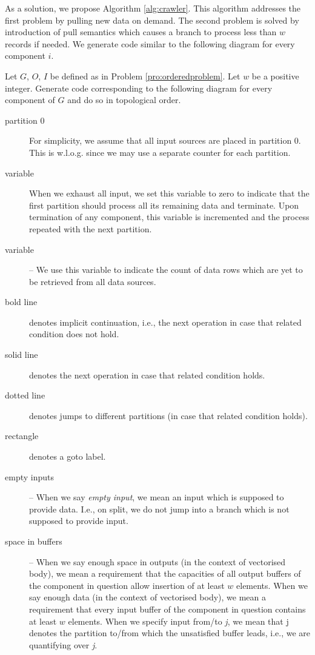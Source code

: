 As a solution, we propose Algorithm \ref{alg:crawler}. This algorithm addresses the first problem by pulling new data on demand. The second problem is solved by introduction of pull semantics which causes a branch to process less than $w$ records if needed. We generate code similar to the following diagram for every component $i$.

  Let $G$, $O$, $I$ be defined as in Problem \ref{pro:orderedproblem}. Let $w$ be a positive integer. Generate code corresponding to the following diagram for every component of $G$ and do so in topological order.
\begin{description}
 \item[partition 0] For simplicity, we assume that all input sources are placed in partition 0. This is w.l.o.g. since we may use a separate counter for each partition. 
 \item[ variable] When we exhaust all input, we set this variable to zero to indicate that the first partition should process all its remaining data and terminate. Upon termination of any component, this variable is incremented and the process repeated with the next partition.
  \item[ variable] -- We use this variable to indicate the count of data rows which are yet to be retrieved from all data sources. 
  \item[bold line] denotes implicit continuation, i.e., the next operation in case that related condition does not hold. 
  \item[solid line] denotes the next operation in case that related condition holds.
  \item[dotted line] denotes jumps to different partitions (in case that related condition holds).
  \item[rectangle] denotes a goto label.
 \item[empty inputs] -- When we say \emph{empty input}, we mean an input which is supposed to provide data. I.e., on split, we do not jump into a branch which is not supposed to provide input.
  \item[space in buffers] -- When we say enough space in outputs (in the context of vectorised body), we mean a requirement that the capacities of all output buffers of the component in question allow insertion of at least $w$ elements. When we say enough data (in the context of vectorised body), we mean a requirement that every input buffer of the component in question contains at least $w$ elements. When we specify input from/to \emph{j}, we mean that j denotes the partition to/from which the unsatisfied buffer leads, i.e., we are quantifying over \emph{j}.

\end{description}
